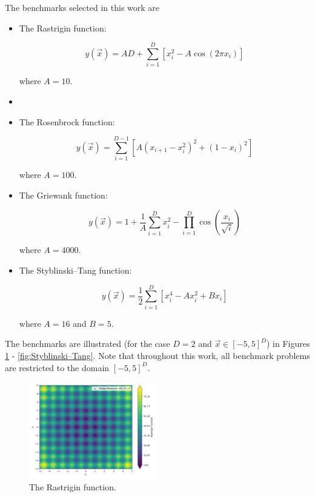 \documentclass[conference]{IEEEtran}
\begin{document}
The benchmarks selected in this work are

\begin{itemize}
	\item The Rastrigin function:
	
	\begin{equation}
		y(\vec{x}) = AD + \sum_{i=1}^{D}\left[x_i^2 - A\cos(2\pi x_i)\right]
		\label{eqn:Rastrigin}
	\end{equation}
	
	\noindent where $A = 10$.

	\item []
	\item The Rosenbrock function:
	
	\begin{equation}
		y(\vec{x}) = \sum_{i=1}^{D - 1}\left[A(x_{i + 1} - x_i^2)^2 + (1 - x_i)^2\right]
		\label{eqn:Rosenbrock}
	\end{equation}
	
	\noindent where $A = 100$.
	
	\item The Griewank function:
	
	\begin{equation}
		y(\vec{x}) = 1 + \frac{1}{A}\sum_{i=1}^{D}x_i^2 - \prod_{i=1}^{D}\cos\left(\frac{x_i}{\sqrt{i}}\right)
		\label{eqn:Griewank}
	\end{equation}
	
	\noindent where $A = 4000$.
	
	\item The Styblinski–Tang function:
	
	\begin{equation}
		y(\vec{x}) = \frac{1}{2}\sum_{i=1}^{D}\left[x_i^4 - Ax_i^2 + Bx_i\right]
		\label{eqn:Styblinski–Tang}
	\end{equation}
	
	\noindent where $A = 16$ and $B = 5$.
\end{itemize}

The benchmarks are illustrated (for the case $D = 2$ and $\vec{x} \in [-5, 5]^D$) in Figures \ref{fig:Rastrigin} - \ref{fig:Styblinski–Tang}. Note that throughout this work, all benchmark problems are restricted to the domain $[-5, 5]^D$.

\begin{figure}[htbp]
	\centerline{\includegraphics[width=0.5\textwidth]{benchmarks/test_Rastrigin.png}}
	\caption{The Rastrigin function.}
	\label{fig:Rastrigin}
\end{figure}
\end{document}
